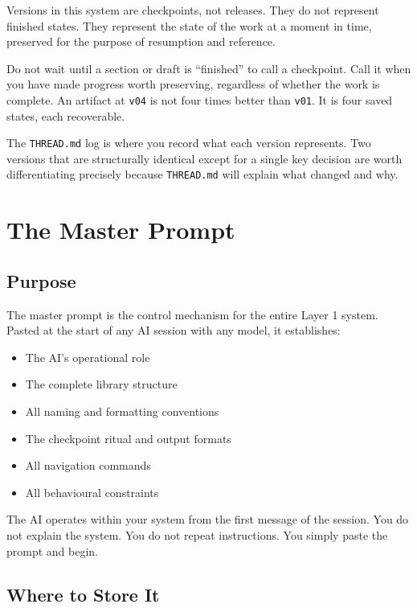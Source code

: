 \documentclass[12pt,letterpaper]{article}
\begin{document}
Versions in this system are checkpoints, not releases. They do not represent
finished states. They represent the state of the work at a moment in time,
preserved for the purpose of resumption and reference.

Do not wait until a section or draft is ``finished'' to call a checkpoint.
Call it when you have made progress worth preserving, regardless of whether
the work is complete. An artifact at \texttt{v04} is not four times better
than \texttt{v01}. It is four saved states, each recoverable.

The \texttt{THREAD.md} log is where you record what each version represents.
Two versions that are structurally identical except for a single key decision
are worth differentiating precisely because \texttt{THREAD.md} will explain
what changed and why.

\section{The Master Prompt}

\subsection{Purpose}

The master prompt is the control mechanism for the entire Layer 1 system.
Pasted at the start of any AI session with any model, it establishes:

\begin{itemize}
  \item The AI's operational role
  \item The complete library structure
  \item All naming and formatting conventions
  \item The checkpoint ritual and output formats
  \item All navigation commands
  \item All behavioural constraints
\end{itemize}

The AI operates within your system from the first message of the session.
You do not explain the system. You do not repeat instructions. You simply
paste the prompt and begin.

\subsection{Where to Store It}
\end{document}
